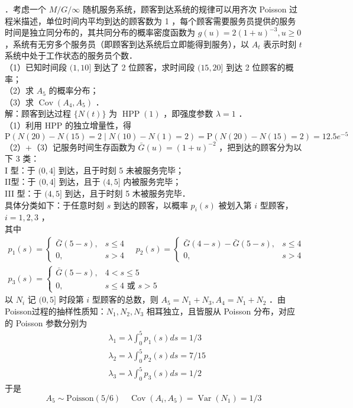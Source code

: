 \documentclass[UTF8,openany]{book}
\begin{document}
．考虑一个 $M / G / \infty$ 随机服务系统，顾客到达系统的规律可以用齐次 Poisson 过程米描述，单位时间内平均到达的顾客数为 1 ，每个顾客需要服务员提供的服务时间是独立同分布的，其共同分布的概率密度函数为 $g(u)=2(1+u)^{-3}, u \geq 0$ ，系统有无穷多个服务员（即顾客到达系统后立即能得到服务），以 $A_{t}$ 表示时刻 $t$ 系统中处于工作状态的服务员个数．\\
（1）已知时间段 $(1,10]$ 到达了 2 位顾客，求时间段 $(15,20]$ 到达 2 位顾客的概率；\\
（2）求 $A_{5}$ 的概率分布；\\
（3）求 $\operatorname{Cov}\left(A_{4}, A_{5}\right)$ ．\\
解：顾客到达过程 $\{N(t)\}$ 为 $\operatorname{HPP}(1)$ ，即强度参数 $\lambda=1$ ．\\
（1）利用 HPP 的独立增量性，得
$$
\mathrm{P}(N(20)-N(15)=2 \mid N(10)-N(1)=2)=\mathrm{P}(N(20)-N(15)=2)=12.5 e^{-5}
$$
（2）+（3）记服务时间生存函数为 $\bar{G}(u)=(1+u)^{-2}$ ，把到达的顾客分为以下 3 类：\\
I 型：于 $(0,4]$ 到达，且于时刻 5 未被服务完毕；\\
II型：于 $(0,4]$ 到达，且于 $(4,5]$ 内被服务完毕；\\
III 型：于 $(4,5]$ 到达，且于时刻 5 木被服务完毕．\\
具体分类如下：于任意时刻 $s$ 到达的顾客，以概率 $p_{i}(s)$ 被划入第 $i$ 型顾客，$i=1,2,3$ ，\\
其中
$$
\begin{gathered}
	p_{1}(s)=\left\{\begin{array}{ll}
		\bar{G}(5-s), & s \leq 4 \\
		0, & s>4
	\end{array} \quad p_{2}(s)= \begin{cases}\bar{G}(4-s)-\bar{G}(5-s), & s \leq 4 \\
		0, & s>4\end{cases} \right. \\
	p_{3}(s)= \begin{cases}\bar{G}(5-s), & 4<s \leq 5 \\
		0, & s \leq 4 \text { 或 } s>5\end{cases}
\end{gathered}
$$
以 $N_{i}$ 记 $(0,5]$ 时段第 $i$ 型顾客的总数，则 $A_{5}=N_{1}+N_{3}, A_{4}=N_{1}+N_{2}$ ．由 Poisson过程的抽样性质知：$N_{1}, N_{2}, N_{3}$ 相耳独立，且皆服从 Poisson 分布，对应的 Poisson 参数分别为
$$
\begin{aligned}
	& \lambda_{1}=\lambda \int_{0}^{5} p_{1}(s) d s=1 / 3 \\
	& \lambda_{2}=\lambda \int_{0}^{5} p_{2}(s) d s=7 / 15 \\
	& \lambda_{3}=\lambda \int_{0}^{5} p_{3}(s) d s=1 / 2
\end{aligned}
$$
于是 $$A_{5} \sim \operatorname{Poisson(5/6)} \quad  \operatorname{Cov}\left(A_{i}, A_{5}\right)=\operatorname{Var}\left(N_{1}\right)=1 / 3$$\\
\end{document}
